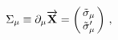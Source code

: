 \begin{equation}
\Sigma_{\mu}\equiv \partial_{\mu}\overrightarrow{\mathbf{X}}=
\left( \begin{array}{@{\,}c@{\,}}
   \tilde{\sigma}_{\mu} \\
  \tilde{\sigma}'_{\mu}
  \end{array}  \right)\,,
\end{equation}

